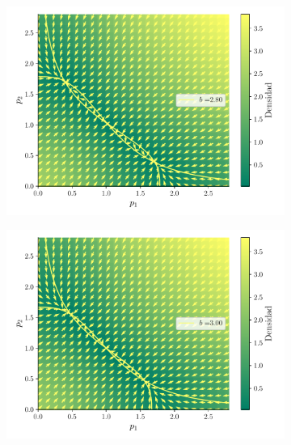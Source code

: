 \documentclass[twocolumn,aps,prl]{revtex4-1}
\begin{document}
\begin{figure}[ht!]
\begin{subfigure}[b]{0.49\linewidth}
      \includegraphics[width = 0.999\textwidth]{figuras/ex02-cosa2-2.pdf}
  \end{subfigure}\quad
  \begin{subfigure}[b]{0.49\linewidth}
      \centering
      \includegraphics[width = 0.999\textwidth]{figuras/ex02-cosa2-3.pdf}
  \end{subfigure}\quad
  \begin{subfigure}[b]{0.49\linewidth}
      \centering

\end{subfigure}
\end{figure}
\end{document}
